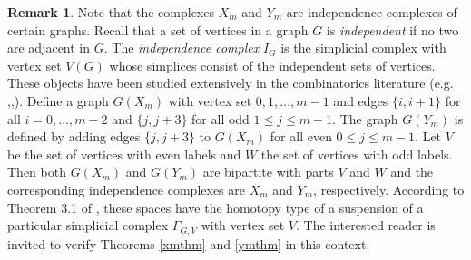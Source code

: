 \documentclass{amsart}
\theoremstyle{definition}
\newtheorem{remark}[theorem]{Remark}
\begin{document}
\begin{remark}
    Note that the complexes $X_m$ and $Y_m$ are independence complexes of certain graphs. Recall that a set of vertices in a graph $G$ is {\em independent} if no two are adjacent in $G$. The {\em independence complex} $I_G$ is the simplicial complex with vertex set $V(G)$ whose simplices consist of the independent sets of vertices. These objects have been studied extensively in the combinatorics literature (e.g. \cite{Barmak2013},\cite{Jonsson2011},\cite{Kozlov1999}). Define a graph $G(X_m)$ with vertex set $0,1,\dots ,m-1$ and edges $\{i,i+1\}$ for all $i=0,\dots ,m-2$ and $\{j,j+3\}$ for all odd $1\le j\le m-1$. The graph $G(Y_m)$ is defined by adding edges $\{j,j+3\}$ to $G(X_m)$ for all even $0\le j\le m-1$. Let $V$ be the set of vertices with even labels and $W$ the set of vertices with odd labels. Then both $G(X_m)$ and $G(Y_m)$ are bipartite with parts $V$ and $W$ and the corresponding independence complexes are $X_m$ and $Y_m$, respectively. According to Theorem 3.1 of \cite{Jonsson2011}, these spaces have the homotopy type of a suspension of a particular simplicial complex $\Gamma_{G,V}$ with vertex set $V$. The interested reader is invited to verify Theorems \ref{xmthm} and \ref{ymthm} in this context.
\end{remark}



\end{document}
